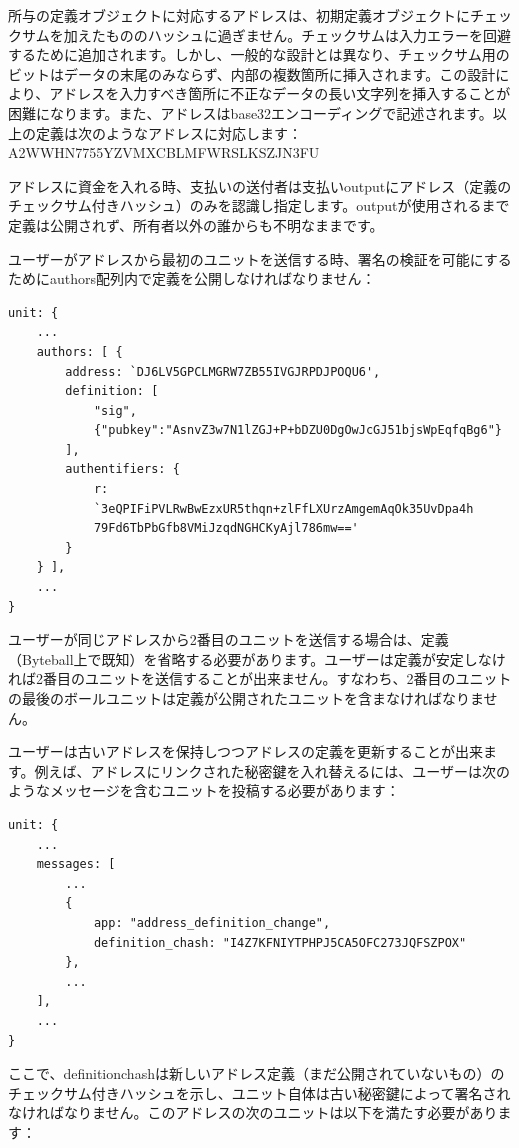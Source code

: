 \documentclass[a4paper, dvipdfmx]{jsarticle}
\begin{document}
所与の定義オブジェクトに対応するアドレスは、初期定義オブジェクトにチェックサムを加えたもののハッシュに過ぎません。チェックサムは入力エラーを回避するために追加されます。しかし、一般的な設計とは異なり、チェックサム用のビットはデータの末尾のみならず、内部の複数箇所に挿入されます。この設計により、アドレスを入力すべき箇所に不正なデータの長い文字列を挿入することが困難になります。また、アドレスはbase32エンコーディングで記述されます。以上の定義は次のようなアドレスに対応します：A2WWHN7755YZVMXCBLMFWRSLKSZJN3FU

アドレスに資金を入れる時、支払いの送付者は支払いoutputにアドレス（定義のチェックサム付きハッシュ）のみを認識し指定します。outputが使用されるまで定義は公開されず、所有者以外の誰からも不明なままです。

ユーザーがアドレスから最初のユニットを送信する時、署名の検証を可能にするためにauthors配列内で定義を公開しなければなりません：

\begin{lstlisting}[basicstyle=\ttfamily\footnotesize, frame=none]
unit: {
    ...
    authors: [ {
        address: `DJ6LV5GPCLMGRW7ZB55IVGJRPDJPOQU6',
        definition: [
            "sig",
            {"pubkey":"AsnvZ3w7N1lZGJ+P+bDZU0DgOwJcGJ51bjsWpEqfqBg6"}
        ],
        authentifiers: {
            r:
            `3eQPIFiPVLRwBwEzxUR5thqn+zlFfLXUrzAmgemAqOk35UvDpa4h
            79Fd6TbPbGfb8VMiJzqdNGHCKyAjl786mw=='
        }
    } ],
    ...
}
\end{lstlisting}

ユーザーが同じアドレスから2番目のユニットを送信する場合は、定義（Byteball上で既知）を省略する必要があります。ユーザーは定義が安定しなければ2番目のユニットを送信することが出来ません。すなわち、2番目のユニットの最後のボールユニットは定義が公開されたユニットを含まなければなりません。

ユーザーは古いアドレスを保持しつつアドレスの定義を更新することが出来ます。例えば、アドレスにリンクされた秘密鍵を入れ替えるには、ユーザーは次のようなメッセージを含むユニットを投稿する必要があります：

\begin{lstlisting}[basicstyle=\ttfamily\footnotesize, frame=none]
unit: {
    ...
    messages: [
        ...
        {
            app: "address_definition_change",
            definition_chash: "I4Z7KFNIYTPHPJ5CA5OFC273JQFSZPOX"
        },
        ...
    ],
    ...
}
\end{lstlisting}

\noindent ここで、definition\textunderscore chashは新しいアドレス定義（まだ公開されていないもの）のチェックサム付きハッシュを示し、ユニット自体は古い秘密鍵によって署名されなければなりません。このアドレスの次のユニットは以下を満たす必要があります：
\end{document}

